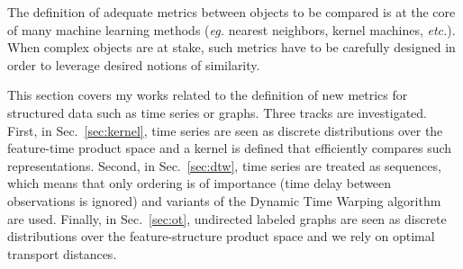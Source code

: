 The definition of adequate metrics between objects to be compared is at the
core of many machine learning methods (\emph{eg.} nearest neighbors, kernel
machines, \emph{etc.}).
When complex objects are at stake, such metrics have to be carefully designed
in order to leverage desired notions of similarity.

This section covers my works related to the definition of new metrics for
structured data such as time series or graphs.
Three tracks are investigated.
First, in Sec.~\ref{sec:kernel}, time series are seen as discrete
distributions over the feature-time product space and a kernel is defined that
efficiently compares such representations.
Second, in Sec.~\ref{sec:dtw}, time series are treated as sequences, which
means that only ordering is of importance (time delay between observations
is ignored) and variants of the Dynamic Time Warping algorithm are used.
Finally, in Sec.~\ref{sec:ot}, undirected labeled graphs are seen as
discrete distributions over the feature-structure product space and we rely on
optimal transport distances.




